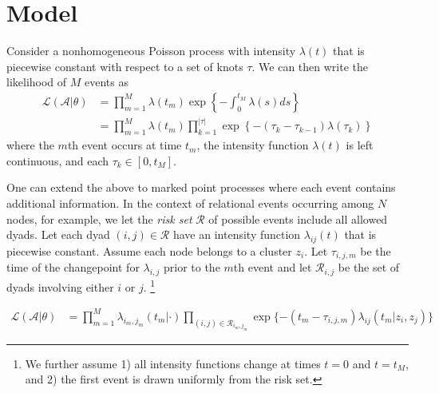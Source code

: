 \documentclass[11pt]{article}
\begin{document}
\section{Model}

Consider a nonhomogeneous Poisson process with  intensity $\lambda(t)$ that is piecewise constant with respect to a set of knots $\tau$.  We can then write the likelihood of $M$ events as
\begin{align}
\mathcal{L}(\mathcal{A}|\theta) &= \prod_{m=1}^M \lambda(t_m) \exp\left\{ - \int_{0}^{t_M} \lambda(s)ds \right\} \\
&= \prod_{m=1}^M \lambda(t_m) \prod_{k=1}^{|\tau|} \exp\left\{ - (\tau_{k} - \tau_{k-1}) \lambda(\tau_k) \right\}
\end{align}
\noindent where the $m$th event occurs at time $t_m$, the intensity function $\lambda(t)$ is left continuous, and each $\tau_k \in [0,t_M]$.

One can extend the above to marked point processes where each event contains additional information.  In the context of relational events occurring among $N$ nodes, for example, we let the \emph{risk set} $\mathcal{R}$ of possible events include all allowed dyads.  Let each dyad $(i,j) \in \mathcal{R}$ have an intensity function $\lambda_{ij}(t)$ that is piecewise constant.  Assume each node belongs to a cluster $z_i$. Let $\tau_{i,j,m}$ be the time  of the changepoint for $\lambda_{i,j}$ prior to the $m$th event and let $\mathcal{R}_{i,j}$ be the set of dyads involving either $i$ or $j$. \footnote{We further assume 1) all intensity functions change at times $t=0$ and $t=t_M$, and 2) the first event is drawn uniformly from the risk set.}

\begin{align}
\mathcal{L}(\mathcal{A}|\theta) &= \prod_{m=1}^M \lambda_{i_m,j_m}(t_m|\cdot) \prod_{(i,j) \in \mathcal{R}_{i_m,j_m}}\exp\{ - (t_m - \tau_{i,j,m}) \lambda_{ij}(t_m | z_i,z_j) \}
\end{align}
\end{document}
